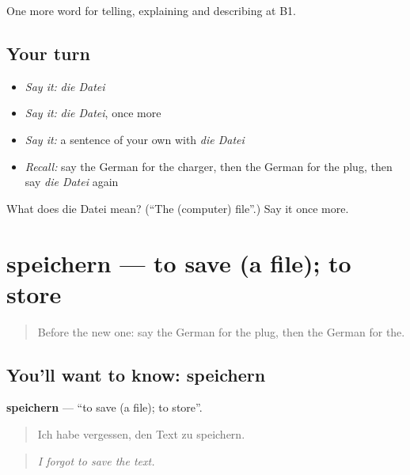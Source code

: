 \begin{grammarlens}[title={What you've built}]
One more word for telling, explaining and describing at B1.
\end{grammarlens}

\subsection*{Your turn}
\begin{itemize}
\raggedright
  \item \emph{Say it:} \emph{die Datei}
  \item \emph{Say it:} \emph{die Datei}, once more
  \item \emph{Say it:} a sentence of your own with \emph{die Datei}
  \item \emph{Recall:} say the German for the charger, then the German for the plug, then say \emph{die Datei} again
\end{itemize}

\begin{tcolorbox}[breakable,colback=teal!4,colframe=teal!35!black,title={Before you move on}]
What does die Datei mean? (\textquotedblleft{}The (computer) file\textquotedblright{}.) Say it once more.
\end{tcolorbox}
\section[speichern]{speichern — to save (a file); to store}

\label{lesson:GE-C393-speichern}



\begin{quote}
Before the new one: say the German for the plug, then the German for the.
\end{quote}

\subsection*{You'll want to know: speichern}
\textbf{speichern} — \textquotedblleft{}to save (a file); to store\textquotedblright{}.

\begin{quote}
Ich habe vergessen, den Text zu speichern.
\end{quote}

\begin{quote}
\emph{I forgot to save the text.}
\end{quote}

